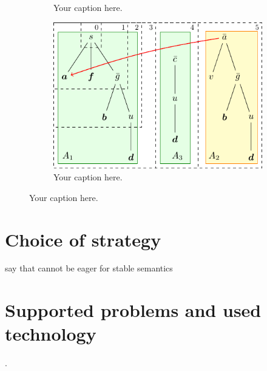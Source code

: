 \documentclass[conference]{IEEEtran}
\begin{document}
\begin{figure}
    \centering
    \begin{subfigure}[t]{0.45\textwidth}
      \centering
      \caption{Your caption here.}
    \end{subfigure}
    \hfill
    \begin{subfigure}[t]{0.45\textwidth}
      \centering
      \includegraphics[scale=0.8]{diagrams/diagram.pdf}
      \caption{Your caption here.}
    \end{subfigure}
    \caption{Your caption here.}

    \label{fig:diagrams}
  \end{figure}

\section{Choice of strategy}

say that cannot be eager for stable semantics

\section{Supported problems and used technology}
\cite{b6} \cite{GorczycaThesis} \cite{Diller2021} \cite{Diller2022}. 
\end{document}
